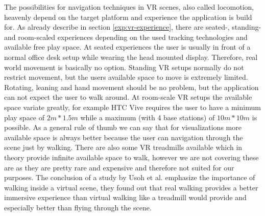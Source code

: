 The possibilities for navigation techniques in VR scenes, also called locomotion, heavenly depend on the target platform and experience the application is build for. As already describe in section \ref{exp:vr-experience}, there are seated-, standing- and room-scaled experiences depending on the used tracking technologies and available free play space.
At seated experiences the user is usually in front of a normal office desk setup while wearing the head mounted display. Therefore, real world movement is basically no option. 
Standing VR setups normally do not restrict movement, but the users available space to move is extremely limited. Rotating, leaning and hand movement should be no problem, but the application can not expect the user to walk around.
At room-scale VR setups the available space variate greatly, for example HTC Vive requires the user to have a minimum play space of $2m * 1.5m$ while a maximum (with 4 base stations) of $10m * 10m$ is possible. As a general rule of thumb we can say that for visualizations more available space is always better because the user can navigation through the scene just by walking. 
There are also some VR treadmills available which in theory provide infinite available space to walk, however we are not covering these are as they are pretty rare and expensive and therefore not suited for our purposes. The conclusion of a study by Usoh et al. \cite{usoh_walking_1999} emphasize the importance of walking inside a virtual scene, they found out that real walking provides a better immersive experience than virtual walking like a treadmill would provide and especially better than flying through the scene. 

